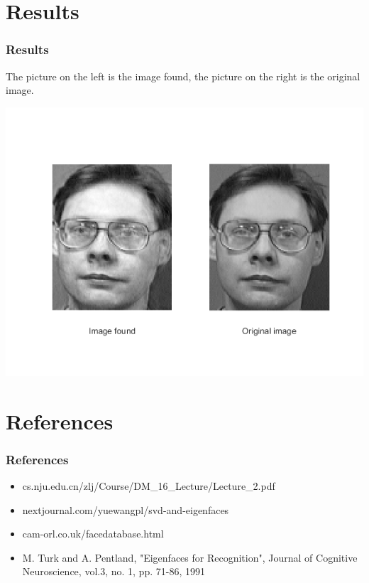 \documentclass[10pt]{beamer}
\begin{document}
\section{Results}
    \begin{frame}
        \frametitle{Results}
        The picture on the left is the image found, the picture on the right is the original image.
        \begin{center}
            \includegraphics[scale=0.7]{recognized_face}    
        \end{center}
        
    \end{frame}

    \section{References}
\begin{frame}
    \frametitle{References}
    \begin{itemize}
        \item cs.nju.edu.cn/zlj/Course/DM\_16\_Lecture/Lecture\_2.pdf
        \item nextjournal.com/yuewangpl/svd-and-eigenfaces 
        \item cam-orl.co.uk/facedatabase.html 
        \item M. Turk and A. Pentland, "Eigenfaces for Recognition", Journal of Cognitive Neuroscience, vol.3, no. 1, pp. 71-86, 1991
    \end{itemize}
\end{frame}
\end{document}
